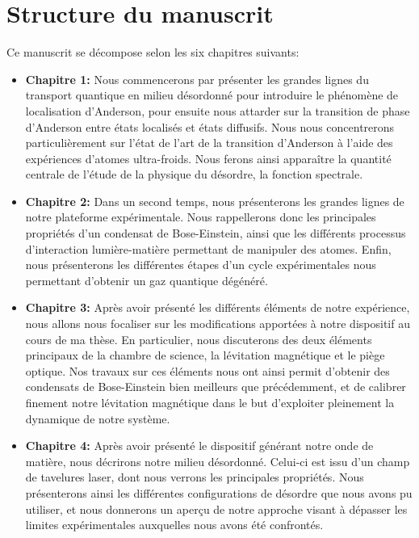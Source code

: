 \section*{Structure du manuscrit}
Ce manuscrit se décompose selon les six chapitres suivants:
\begin{itemize}
\item[\textendash] \textbf{Chapitre 1:} Nous commencerons par présenter les grandes lignes du transport quantique en milieu désordonné pour introduire le phénomène de localisation d'Anderson, pour ensuite nous attarder sur la transition de phase d'Anderson entre états localisés et états diffusifs. Nous nous concentrerons particulièrement sur l'état de l'art de la transition d'Anderson à l'aide des expériences d'atomes ultra-froids.  Nous ferons ainsi apparaître la quantité centrale de l'étude de la physique du désordre, la fonction spectrale. \\

\item[\textendash] \textbf{Chapitre 2:} Dans un second temps, nous présenterons les grandes lignes de notre plateforme expérimentale. Nous rappellerons donc les principales propriétés d'un condensat de Bose-Einstein, ainsi que les différents processus d'interaction lumière-matière permettant de manipuler des atomes. Enfin, nous présenterons les différentes étapes d'un cycle expérimentales nous permettant d'obtenir un gaz quantique dégénéré. \\

\item[\textendash] \textbf{Chapitre 3:} Après avoir présenté les différents éléments de notre expérience, nous allons nous focaliser sur les modifications apportées à notre dispositif au cours de ma thèse. En particulier, nous discuterons des deux éléments principaux de la chambre de science, la lévitation magnétique et le piège optique. Nos travaux sur ces éléments nous ont ainsi permit d'obtenir des condensats de Bose-Einstein bien meilleurs que précédemment, et de calibrer finement notre lévitation magnétique dans le but d'exploiter pleinement la dynamique de notre système. \\

\item[\textendash] \textbf{Chapitre 4:} Après avoir présenté le dispositif générant notre onde de matière, nous décrirons notre milieu désordonné. Celui-ci est issu d'un champ de tavelures laser, dont nous verrons les principales propriétés. Nous présenterons ainsi les différentes configurations de désordre que nous avons pu utiliser, et nous donnerons un aperçu de notre approche visant à dépasser les limites expérimentales auxquelles nous avons été confrontés. \\


\end{itemize}
